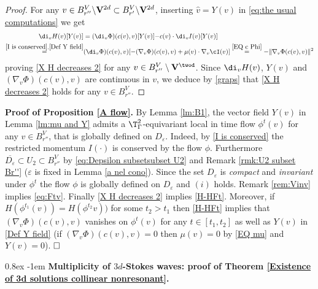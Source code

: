 \documentclass[11pt,a4paper,reqno]{article}
\makeatletter
\renewcommand{\paragraph}{%
  \@startsection{paragraph}{4}{\z@}%
  {0.8ex}  %
  {-1em}   %
  {\normalfont\bfseries}%
}
\numberwithin{equation}{section}
\theoremstyle{definition}
\makeatother
\begin{document}
\begin{proof}
   For any  $v\in B_{r''}^V {\setminus {\bf V}^{2d} } \subset B_{r'}^V {\setminus {\bf V}^{2d} }  $, inserting $\hat v=Y(v)$ in 
\eqref{eq:the usual computations} we get 
\begin{equation}
\label{graps} 
    \begin{aligned}
     \di_v H(v)[Y(v)]& = (\di_v \Phi)(c(v),v)[Y(v)] {-}  c(v)\cdot \di_v I(v)[Y(v)]  \\
     \stackrel{\eqref{I is conserved},\eqref{Def Y field}}=& (\di_v\Phi) (c(v),v)[{-} (\nabla_v \Phi)(c(v),v)+\mu(v)\cdot \nabla_v\cI(v)] 
      \stackrel{\eqref{EQ c Phi}}=-
\| \nabla_v\Phi(c(v),v) \|^2 
    \end{aligned}
    \end{equation}
proving \eqref{X H decreases 2} for any $v\in B_{r''}^V\setminus {\bf V}^{\twod}$.
    Since $ \di_v H (v) $, $ Y(v) $ and $ (\nabla_v\Phi)(c(v),v) $ are continuous in $ v $, we deduce by  \eqref{graps} that 
    \eqref{X H decreases 2} 
    holds for any  
    $ v \in  B_{r''}^V $.
\end{proof}

\noindent 
{\bf Proof of Proposition \ref{A flow}.}
    By Lemma \ref{lm:B1},  the vector field $Y(v)$ 
     in Lemma \ref{lm:mu and Y} admits 
     a 
     $\T^2_\Gamma$-equivariant local in time 
      flow   $\phi^t(v)$ for any $ v \in B_{r''}^V $,  that is globally defined on $ D_\varepsilon $. Indeed, 
  by \eqref{I is conserved} 
    the restricted  
    momentum $I(\cdot)$ 
    is conserved by the flow $ \phi $. 
    Furthermore 
     $\overline{D_{\varepsilon}} \subset U_2\subset  B_{r''}^V$
    by \eqref{eq:Depsilon subsetsubset U2} and Remark \ref{rmk:U2 subset Br''} ($\varepsilon $ is fixed in Lemma \ref{a nel cono}). 
    Since   the set $D_{\varepsilon} $ is {\it compact} and {\it invariant} under $ \phi^t $ the flow  $ \phi $ is globally defined on $ D_{\varepsilon} $ and
$(i)$ holds.
Remark \ref{rem:Vinv} implies \eqref{eq:Ftv}.
    Finally  \eqref{X H decreases 2} implies \eqref{H-HFt}.
    Moreover, if $H(\phi^{t_1}(v))=H(\phi^{t_2}v))$ for some $t_2>t_1$ then  \eqref{H-HFt} implies that $ (\nabla_v\Phi)(c(v),v)$  vanishes on $ \phi^t(v) $ for any $t\in [t_1,t_2]$ as well as  $ Y(v) $ in \eqref{Def Y field}
    (if $ (\nabla_v\Phi)(c(v),v) =  0 $ then $ \mu (v) = 0 $ by  \eqref{EQ mu} and $ Y(v) = 0 $). $ \hfill \square$
    
\paragraph{\bf Multiplicity of $3d$-Stokes waves: proof of Theorem \ref{Existence of 3d solutions collinear nonresonant}. } %
\end{document}
